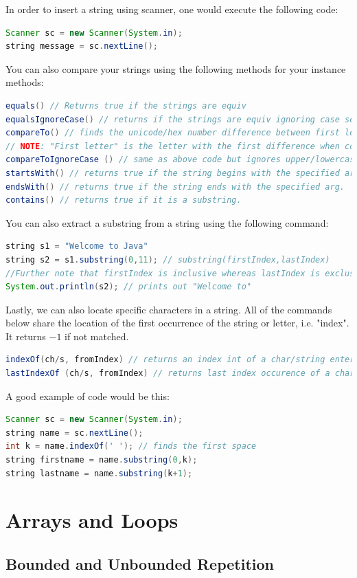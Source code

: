 \documentclass[11pt,a4 paper]{book}
\theoremstyle{plain}
\theoremstyle{definition}
\theoremstyle{remark}
\begin{document}
\begin{flushleft}
In order to insert a string using scanner, one would execute the following code:
\begin{lstlisting}[language = Java]
Scanner sc = new Scanner(System.in);
string message = sc.nextLine();
\end{lstlisting}
You can also compare your strings using the following methods for your instance methods:
\begin{lstlisting}[language = Java]
equals() // Returns true if the strings are equiv
equalsIgnoreCase() // returns if the strings are equiv ignoring case sensitivity
compareTo() // finds the unicode/hex number difference between first letters.
// NOTE: "First letter" is the letter with the first difference when compared.
compareToIgnoreCase () // same as above code but ignores upper/lowercases.
startsWith() // returns true if the string begins with the specified arg.
endsWith() // returns true if the string ends with the specified arg.
contains() // returns true if it is a substring.
\end{lstlisting}
You can also extract a substring from a string using the following command:
\begin{lstlisting}[language = Java]
string s1 = "Welcome to Java"
string s2 = s1.substring(0,11); // substring(firstIndex,lastIndex)
//Further note that firstIndex is inclusive whereas lastIndex is exclusive.
System.out.println(s2); // prints out "Welcome to"
\end{lstlisting}
Lastly, we can also locate specific characters in a string. All of the commands below share the location of the first occurrence of the string or letter, i.e. "index". It returns $-1$ if not matched.
\begin{lstlisting}[language = Java]
indexOf(ch/s, fromIndex) // returns an index int of a char/string entered. 
lastIndexOf (ch/s, fromIndex) // returns last index occurence of a char/string entered.
\end{lstlisting}
A good example of code would be this:
\begin{lstlisting}[language = Java]
Scanner sc = new Scanner(System.in);
string name = sc.nextLine();
int k = name.indexOf(' '); // finds the first space
string firstname = name.substring(0,k);
string lastname = name.substring(k+1);
\end{lstlisting}
\section{Arrays and Loops}
\subsection{Bounded and Unbounded Repetition}

\end{flushleft}
\end{document}

